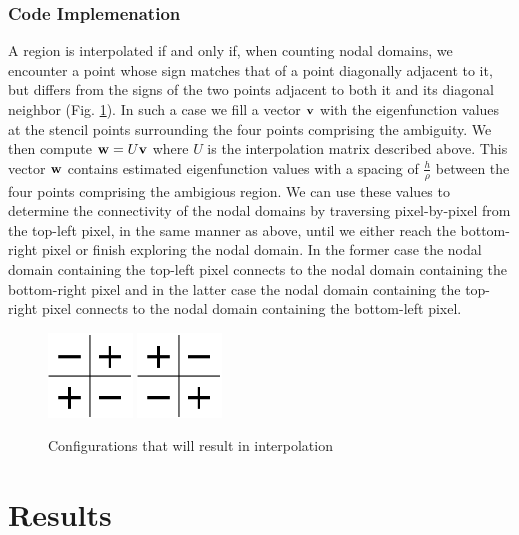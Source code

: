 \documentclass{report}
\begin{document}
\subsection{Code Implemenation}
A region is interpolated if and only if, when counting nodal domains, we encounter a point whose sign matches that of a point diagonally adjacent to it, but differs from the signs of the two points adjacent to both it and its diagonal neighbor (Fig. \ref{fig:trouble_spot}). In such a case we fill a vector ${\bf v}$ with the eigenfunction values at the stencil points surrounding the four points comprising the ambiguity. We then compute ${\bf w} = U {\bf v}$ where $U$ is the interpolation matrix described above. This vector ${\bf w}$ contains estimated eigenfunction values with a spacing of $\frac{h}{\rho}$ between the four points comprising the ambigious region. We can use these values to determine the connectivity of the nodal domains by traversing pixel-by-pixel from the top-left pixel, in the same manner as above, until we either reach the bottom-right pixel or finish exploring the nodal domain. In the former case the nodal domain containing the top-left pixel connects to the nodal domain containing the bottom-right pixel and in the latter case the nodal domain containing the top-right pixel connects to the nodal domain containing the bottom-left pixel.

\begin{figure}[h!]
  \begin{center}
    \includegraphics[width=0.2\textwidth]{figs/interpolation/trouble_spot1.eps}
    \hspace{1 cm} 
    \includegraphics[width=0.2\textwidth]{figs/interpolation/trouble_spot2.eps}
    \caption{Configurations that will result in interpolation}
    \label{fig:trouble_spot}
  \end{center}
\end{figure}


\chapter{Results}
\end{document}
